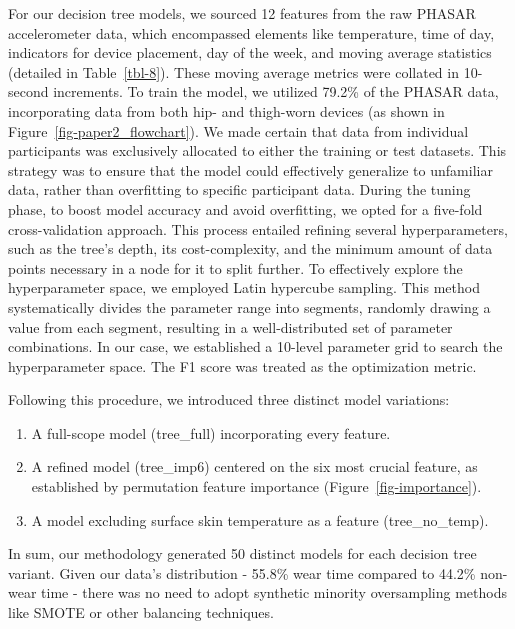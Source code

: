 \documentclass[
  10pt,
]{scrbook}
\begin{document}
For our decision tree models, we sourced 12 features from the raw PHASAR
accelerometer data, which encompassed elements like temperature, time of
day, indicators for device placement, day of the week, and moving
average statistics (detailed in Table~\ref{tbl-8}). These moving average
metrics were collated in 10-second increments. To train the model, we
utilized 79.2\% of the PHASAR data, incorporating data from both hip-
and thigh-worn devices (as shown in Figure~\ref{fig-paper2_flowchart}).
We made certain that data from individual participants was exclusively
allocated to either the training or test datasets. This strategy was to
ensure that the model could effectively generalize to unfamiliar data,
rather than overfitting to specific participant data. During the tuning
phase, to boost model accuracy and avoid overfitting, we opted for a
five-fold cross-validation approach. This process entailed refining
several hyperparameters, such as the tree's depth, its cost-complexity,
and the minimum amount of data points necessary in a node for it to
split further. To effectively explore the hyperparameter space, we
employed Latin hypercube sampling. This method systematically divides
the parameter range into segments, randomly drawing a value from each
segment, resulting in a well-distributed set of parameter combinations.
In our case, we established a 10-level parameter grid to search the
hyperparameter space. The F1 score was treated as the optimization
metric.

Following this procedure, we introduced three distinct model variations:

\begin{enumerate}
\def\labelenumi{\arabic{enumi}.}
\item
  A full-scope model (\textsf{tree\_full}) incorporating every feature.
\item
  A refined model (\textsf{tree\_imp6}) centered on the six most crucial
  feature, as established by permutation feature importance
  (Figure~\ref{fig-importance}).
\item
  A model excluding surface skin temperature as a feature
  (\textsf{tree\_no\_temp}).
\end{enumerate}

In sum, our methodology generated 50 distinct models for each decision
tree variant. Given our data's distribution - 55.8\% wear time compared
to 44.2\% non-wear time - there was no need to adopt synthetic minority
oversampling methods like SMOTE or other balancing techniques.
\end{document}
